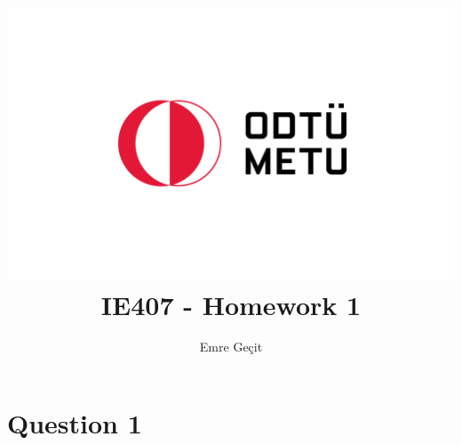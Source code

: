 \documentclass{article}
\author{Emre Geçit}
\title{\includegraphics{9.4.png}\\ IE407 - Homework 1}
\begin{document}
\maketitle

\newpage
\section*{Question 1}
\end{document}
